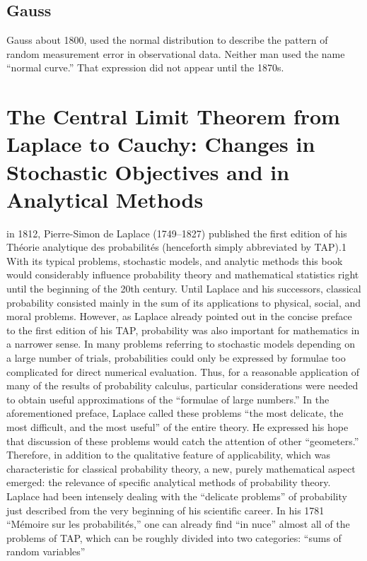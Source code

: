 \documentclass{article}
\begin{document}
\subsection{Gauss}
Gauss about 1800, used the normal distribution to describe the pattern of random measurement error in observational data. Neither man used the name “normal curve.” That expression did not appear until the 1870s.

\section{The Central Limit Theorem from Laplace to Cauchy: 
Changes in Stochastic Objectives and in Analytical Methods}
in 1812, Pierre-Simon de Laplace (1749–1827) published the first edition of his
Théorie analytique des probabilités (henceforth simply abbreviated by TAP).1 With
its typical problems, stochastic models, and analytic methods this book would considerably influence probability theory and mathematical statistics right until the beginning of the 20th century.
Until Laplace and his successors, classical probability consisted mainly in the
sum of its applications to physical, social, and moral problems. However, as Laplace
already pointed out in the concise preface to the first edition of his TAP, probability
was also important for mathematics in a narrower sense. In many problems referring
to stochastic models depending on a large number of trials, probabilities could only
be expressed by formulae too complicated for direct numerical evaluation. Thus,
for a reasonable application of many of the results of probability calculus, particular considerations were needed to obtain useful approximations of the “formulae
of large numbers.” In the aforementioned preface, Laplace called these problems
“the most delicate, the most difficult, and the most useful” of the entire theory.
He expressed his hope that discussion of these problems would catch the attention of
other “geometers.” Therefore, in addition to the qualitative feature of applicability,
which was characteristic for classical probability theory, a new, purely mathematical
aspect emerged: the relevance of specific analytical methods of probability theory.
Laplace had been intensely dealing with the “delicate problems” of probability
just described from the very beginning of his scientific career. In his 1781 “Mémoire
sur les probabilités,” one can already find “in nuce” almost all of the problems of
TAP, which can be roughly divided into two categories: “sums of random variables”
\end{document}
